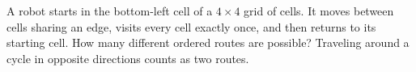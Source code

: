 A robot starts in the bottom-left cell of a $4\times4$ grid of cells. It moves between cells sharing an edge, visits every cell exactly once, and then returns to its starting cell. How many different ordered routes are possible? Traveling around a cycle in opposite directions counts as two routes.

